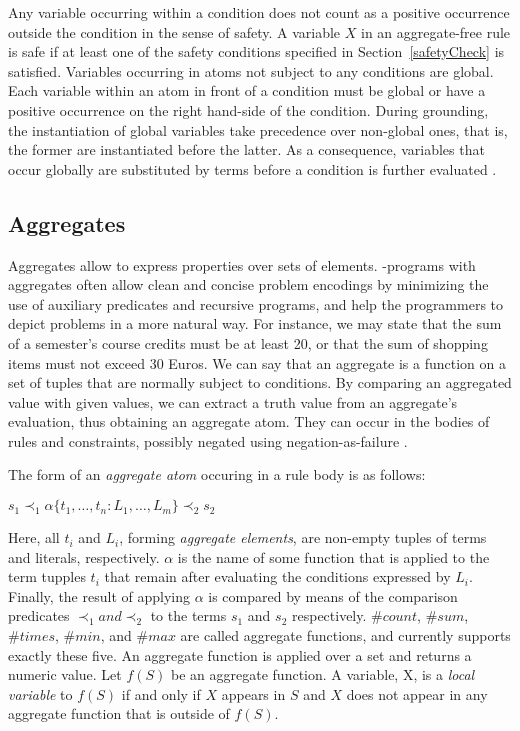 \documentclass[a4paper, titlepage]{article}
\newcommand\mycenterline[1]{\par\smallskip\centerline{#1} \smallskip}
\begin{document}
Any variable occurring 
within a condition does not count as a positive occurrence 
outside the condition in the sense of safety. A variable 
$X$ in an aggregate-free rule is safe if at least one of 
the safety conditions specified in Section~\ref{safetyCheck} is satisfied.
Variables occurring in atoms not subject to any conditions 
are global. Each variable within an atom in front of a 
condition must be global or have a positive occurrence on 
the right hand-side of the condition. During grounding, the 
instantiation of global variables take precedence over non-global ones, that is, the former are instantiated before 
the latter. As a consequence, variables that occur globally 
are substituted by terms before a condition is further 
evaluated \cite{gkklorst2015}.    

\subsection{Aggregates}
\label{aggregates}
Aggregates allow to express properties over sets of 
elements. \hex{}-programs with aggregates often allow clean 
and concise problem encodings by minimizing the use of 
auxiliary predicates and recursive programs, and help the 
programmers to depict problems in a more natural way. For 
instance, we may state that the sum of a semester's course 
credits must be at least 20, or that the sum of shopping 
items must not exceed 30 Euros. We can say that an 
aggregate is a function on a set of tuples that are 
normally subject to conditions. By comparing an aggregated 
value with given values, we can extract a truth value from 
an aggregate's evaluation, thus obtaining an aggregate 
atom. They can occur in the bodies of rules and constraints, 
possibly negated using negation-as-failure \cite{gkklorst2015}.

The form of an \emph{aggregate atom} occuring in a rule 
body is as follows: \mycenterline{$s_1 \prec_1 \alpha \{ 
 t_1, \dots, t_n : L_1, \dots, L_m\} \prec_2 s_2$} 
Here, all $\mathit{t_i}$ and $\mathit{L_i}$, forming 
\emph{aggregate elements}, are non-empty tuples of terms 
and literals, respectively. $\alpha$ is the name of some 
function that is applied to the term tupples \texttt{$t_i$} 
that remain after evaluating the conditions expressed by 
$L_i$. Finally,  the result of applying $\alpha$ is 
compared by means of the comparison predicates $\prec_1 and 
\prec_2$ to the terms $s_1$ and $s_2$ respectively. 
$\mathit{\#count}$, $\mathit{\#sum}$, $\mathit{\#times}$, 
$\mathit{\#min}$, and $\mathit{\#max}$ are called aggregate 
functions, and \dlvhex{} currently supports exactly these 
five. An aggregate function is applied over a set and 
returns a numeric value. Let $f(S)$ be an aggregate 
function. A variable, X, is a \emph{local variable} to 
$f(S)$ if and only if $X$ appears in $S$ and $X$ does not 
appear in any aggregate function that is outside of $f(S)$.
\end{document}
